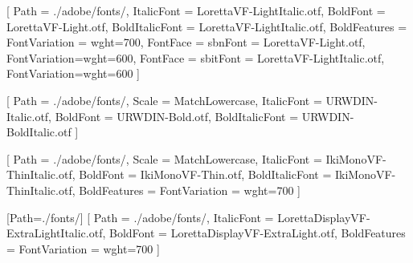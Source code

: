 \usepackage{fontspec}

\setmainfont{LorettaVF-Light.otf}[
    Path           = ./adobe/fonts/,
    ItalicFont     = LorettaVF-LightItalic.otf,
    BoldFont       = LorettaVF-Light.otf,
    BoldItalicFont = LorettaVF-LightItalic.otf,
    BoldFeatures   = {FontVariation = {wght=700}},
    FontFace       = {sb}{n}{Font = LorettaVF-Light.otf, FontVariation={wght=600}},
    FontFace       = {sb}{it}{Font = LorettaVF-LightItalic.otf, FontVariation={wght=600}}
]

\setsansfont{URWDIN-Regular.otf}[
    Path           = ./adobe/fonts/,
    Scale          = MatchLowercase,
    ItalicFont     = URWDIN-Italic.otf,
    BoldFont       = URWDIN-Bold.otf,
    BoldItalicFont = URWDIN-BoldItalic.otf
]

\setmonofont{IkiMonoVF-Thin.otf}[
    Path           = ./adobe/fonts/,
    Scale          = MatchLowercase,
    ItalicFont     = IkiMonoVF-ThinItalic.otf,
    BoldFont       = IkiMonoVF-Thin.otf,
    BoldItalicFont = IkiMonoVF-ThinItalic.otf,
    BoldFeatures   = {FontVariation = {wght=700}}
]

\newfontfamily{}[Path=./fonts/]
\newfontfamily{}[
    Path         = ./adobe/fonts/,
    ItalicFont   = LorettaDisplayVF-ExtraLightItalic.otf,
    BoldFont     = LorettaDisplayVF-ExtraLight.otf,
    BoldFeatures = {FontVariation = {wght=700}}
]

\newcommand{\dinfont}{\sffamily}